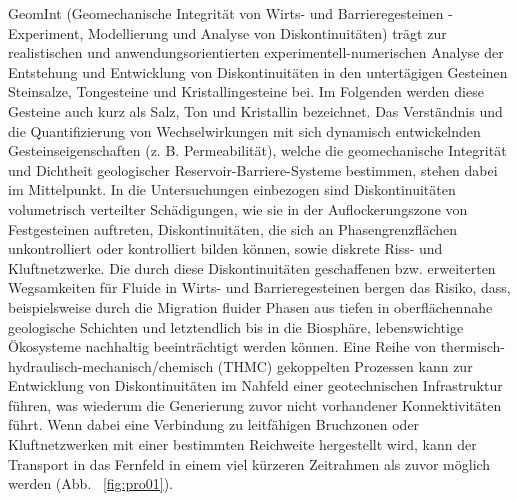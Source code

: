 GeomInt (Geomechanische Integrität von Wirts- und Barrieregesteinen - Experiment, Modellierung und Analyse von Diskontinuitäten) trägt zur realistischen und anwendungsorientierten experimentell-numerischen Analyse der Entstehung und Entwicklung von Diskontinuitäten in den untertägigen Gesteinen Steinsalze, Tongesteine und Kristallingesteine bei. Im Folgenden werden diese Gesteine auch kurz als Salz, Ton und Kristallin bezeichnet. Das Verständnis und die Quantifizierung von Wechselwirkungen mit sich dynamisch entwickelnden Gesteinseigenschaften (z. B. Permeabilität), welche die geomechanische Integrität und Dichtheit geologischer Reservoir-Barriere-Systeme bestimmen, stehen dabei im Mittelpunkt. In die Untersuchungen einbezogen sind Diskontinuitäten volumetrisch verteilter Schädigungen, wie sie in der Auflockerungszone von Festgesteinen auftreten, Diskontinuitäten, die sich an Phasengrenzflächen unkontrolliert oder kontrolliert bilden können, sowie diskrete Riss- und Kluftnetzwerke. Die durch diese Diskontinuitäten geschaffenen bzw. erweiterten Wegsamkeiten für Fluide in Wirts- und Barrieregesteinen bergen das Risiko, dass, beispielsweise durch die Migration fluider Phasen aus tiefen in oberflächennahe geologische Schichten und letztendlich bis in die Biosphäre, lebenswichtige Ökosysteme nachhaltig beeinträchtigt werden können. Eine Reihe von thermisch-hydraulisch-mechanisch/chemisch (THMC) gekoppelten Prozessen kann zur Entwicklung von Diskontinuitäten im Nahfeld einer geotechnischen Infrastruktur führen, was wiederum die Generierung zuvor nicht vorhandener Konnektivitäten führt. Wenn dabei eine Verbindung zu leitfähigen Bruchzonen oder Kluftnetzwerken mit einer bestimmten Reichweite hergestellt wird, kann der Transport in das Fernfeld in einem viel kürzeren Zeitrahmen als zuvor möglich werden (Abb. ~\ref{fig:pro01}).


